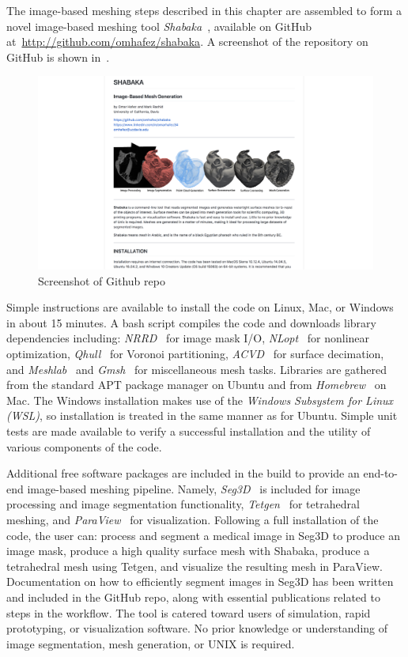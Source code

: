 The image-based meshing steps described in this chapter are assembled to form a novel image-based meshing tool \textit{Shabaka}~\cite{shab}, available on GitHub at~\href{http://github.com/omhafez/shabaka}{{\url{http://github.com/omhafez/shabaka}}}. A screenshot of the repository on GitHub is shown in~.
\begin{figure}[ht!]
\centering
\vspace{2.5mm}
\includegraphics[width=1.0\textwidth]{media/2-shabaka/2-surf/7-shabaka.png}
\caption{Screenshot of Github repo}
\label{fig:github}
\end{figure}
Simple instructions are available to install the code on Linux, Mac, or Windows in about 15 minutes. A bash script compiles the code and downloads library dependencies including: \textit{NRRD}~\cite{nrrd} for image mask I/O, \textit{NLopt}~\cite{nlo} for nonlinear optimization, \textit{Qhull}~\cite{barber_1996} for Voronoi partitioning, \textit{ACVD}~\cite{valette_2004} for surface decimation, and \textit{Meshlab}~\cite{meshlab} and \textit{Gmsh}~\cite{geuzaine_2009} for miscellaneous mesh tasks. Libraries are gathered from the standard APT package manager on Ubuntu and from \textit{Homebrew}~\cite{brew} on Mac. The Windows installation makes use of the \textit{Windows Subsystem for Linux (WSL)}, so installation is treated in the same manner as for Ubuntu. Simple unit tests are made available to verify a successful installation and the utility of various components of the code.

Additional free software packages are included in the build to provide an end-to-end image-based meshing pipeline. Namely, \textit{Seg3D}~\cite{Seg3D} is included for image processing and image segmentation functionality, \textit{Tetgen}~\cite{tetgen} for tetrahedral meshing, and \textit{ParaView}~\cite{paraview} for visualization. Following a full installation of the code, the user can: process and segment a medical image in Seg3D to produce an image mask, produce a high quality surface mesh with Shabaka, produce a tetrahedral mesh using Tetgen, and visualize the resulting mesh in ParaView. Documentation on how to efficiently segment images in Seg3D has been written and included in the GitHub repo, along with essential publications related to steps in the workflow. The tool is catered toward users of simulation, rapid prototyping, or visualization software. No prior knowledge or understanding of image segmentation, mesh generation, or UNIX is required.

